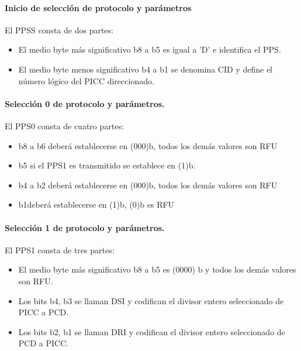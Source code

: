 \paragraph{Inicio de selección de protocolo y parámetros}
El PPSS consta de dos partes:\par

\begin{itemize}
	\item El medio byte más significativo b8 a b5 es igual a 'D' e identifica el PPS.\par

	\item El medio byte menos significativo b4 a b1 se denomina CID y define el número lógico del PICC direccionado.
\end{itemize}\par

\paragraph{Selección 0 de protocolo y parámetros.}
El PPS0 consta de cuatro partes:\par

\begin{itemize}
	\item b8 a b6 deberá establecerse en (000)b, todos los demás valores son RFU\par

	\item b5 si el PPS1 es transmitido se establece en (1)b.\par

	\item b4 a b2 deberá establecerse en (000)b, todos los demás valores son RFU\par

	\item b1deberá establecerse en (1)b, (0)b es RFU
\end{itemize}\par

\paragraph{Selección 1 de protocolo y parámetros.}
El PPS1 consta de tres partes:\par

\begin{itemize}
	\item El medio byte más significativo b8 a b5 es (0000) b y todos los demás valores son RFU.\par

	\item Los bits b4, b3 se llaman DSI y codifican el divisor entero seleccionado de PICC a PCD.\par

	\item Los bits b2, b1 se llaman DRI y codifican el divisor entero seleccionado de PCD a PICC.
\end{itemize}\par

